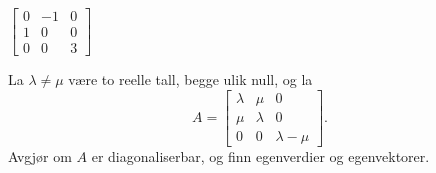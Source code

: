 \begin{oppgave}
\begin{punkt}
$\begin{bmatrix}
0 & -1 & 0\\
1 & 0 & 0\\
0 & 0 & 3
\end{bmatrix}$
\end{punkt}

\end{oppgave}

\begin{oppgave}
La $\lambda\neq \mu$ være to reelle tall, begge ulik null, og la
$$A=
\begin{bmatrix}
\lambda & \mu & 0\\
\mu & \lambda & 0\\
0 & 0 & \lambda-\mu
\end{bmatrix}.$$
Avgjør om $A$ er diagonaliserbar, og finn egenverdier og egenvektorer.
\end{oppgave}

%
%
%
%
%
%
%


